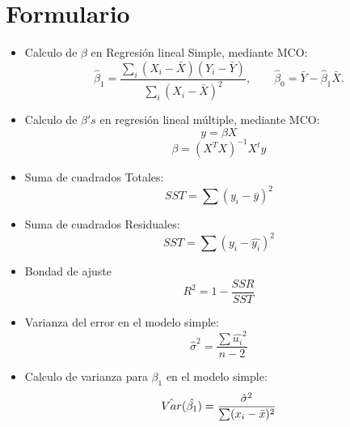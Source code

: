 \documentclass[10pt,a4paper]{article}
\begin{document}
\newpage
\section{Formulario}
\begin{itemize}

\item Calculo de $\beta$ en Regresión lineal Simple, mediante MCO:
\[
\hat{\beta}_1=\frac{\sum_i (X_i-\bar{X})(Y_i-\bar{Y})}{\sum_i (X_i-\bar{X})^2},\qquad
\hat{\beta}_0=\bar{Y}-\hat{\beta}_1\bar{X}.
\]
\item Calculo de $\beta's$ en regresión lineal múltiple, mediante MCO:
$$y = \beta X$$
$$\beta = (X^TX)^{-1}X^ty$$


\item Suma de cuadrados Totales:
$$SST=\sum (y_i-\bar{y})^2$$

\item Suma de cuadrados Residuales:
$$SST=\sum (y_i-\hat{y_i})^2$$

\item Bondad de ajuste
$$R^2 = 1-\frac{SSR}{SST}$$

\item Varianza del error en el modelo simple:
$$\hat{\sigma}^2=\frac{\sum \hat{u_i}^2}{n-2}$$

\item Calculo de varianza para $\beta_1$ en el modelo simple:
$$\Hat{Var}(\hat{\beta_1})=\frac{\hat{\sigma}^2}{\sum (x_i-\bar{x})^2}$$

\end{itemize}
 
\end{document}
